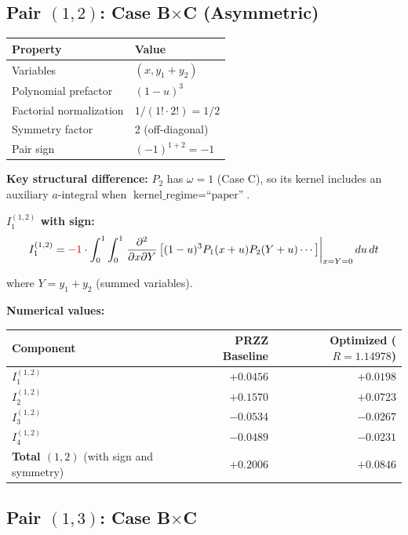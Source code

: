 \documentclass[11pt]{article}
\begin{document}
\subsection{Pair $(1,2)$: Case B$\times$C (Asymmetric)}

\begin{center}
\begin{tabular}{ll}
\toprule
Property & Value \\
\midrule
Variables & $(x, y_1+y_2)$ \\
Polynomial prefactor & $(1-u)^3$ \\
Factorial normalization & $1/(1! \cdot 2!) = 1/2$ \\
Symmetry factor & 2 (off-diagonal) \\
Pair sign & $(-1)^{1+2} = -1$ \\
\bottomrule
\end{tabular}
\end{center}

\textbf{Key structural difference:} $P_2$ has $\omega = 1$ (Case C), so its kernel includes an auxiliary $a$-integral when $\text{kernel\_regime} = \text{``paper''}$.

\textbf{$I_1^{(1,2)}$ with sign:}
\begin{equation}
I_1^{(1,2)} = \textcolor{signflip}{-1} \cdot \int_0^1 \int_0^1 \left.\frac{\partial^2}{\partial x \partial Y}\left[(1-u)^3 P_1(x+u) P_2(Y+u) \cdots\right]\right|_{x=Y=0} du\, dt
\end{equation}

where $Y = y_1 + y_2$ (summed variables).

\textbf{Numerical values:}

\begin{center}
\begin{tabular}{lrr}
\toprule
Component & PRZZ Baseline & Optimized ($R=1.14978$) \\
\midrule
$I_1^{(1,2)}$ & $+0.0456$ & $+0.0198$ \\
$I_2^{(1,2)}$ & $+0.1570$ & $+0.0723$ \\
$I_3^{(1,2)}$ & $-0.0534$ & $-0.0267$ \\
$I_4^{(1,2)}$ & $-0.0489$ & $-0.0231$ \\
\midrule
\textbf{Total $(1,2)$} (with sign and symmetry) & $+0.2006$ & $+0.0846$ \\
\bottomrule
\end{tabular}
\end{center}

\subsection{Pair $(1,3)$: Case B$\times$C}
\end{document}
